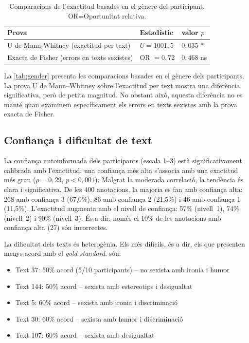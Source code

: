 \iftables
\begin{table}[htbp]
\small
\centering
\begin{tabular}{lll}
\toprule
\textbf{Prova} & \textbf{Estadístic} & \textbf{valor $p$} \\
\midrule
U de Mann-Whitney (exactitud per text) & $U = 1001,5$ & $0,035$ * \\
Exacta de Fisher (errors en texts sexistes) & OR $= 0,72$ & $0,468$ \hphantom{$*$} ns \\
\bottomrule
\end{tabular}
\caption{Comparacions de l'exactitud basades en el gènere del participant. OR=Oportunitat relativa.}
\label{tab:gender}
\end{table}
\fi



La \autoref{tab:gender} presenta les comparacions basades en el gènere dels participants.
La prova U de Mann--Whitney sobre l'exactitud per text mostra una diferència significativa, però de petita magnitud.
No obstant això, aquesta diferència no es manté quan examinem específicament els errors en texts sexistes amb la prova exacta de Fisher.

\subsection{Confiança i dificultat de text}

La confiança autoinformada dels participants (escala 1--3) està significativament calibrada amb l'exactitud: una confiança més alta s'associa amb una exactitud més gran ($\rho = 0,29$, $p < 0,001$).
Malgrat la moderada correlació, la tendència és clara i significativa.
De les 400 anotacions, la majoria es fan amb confiança alta: 268 amb confiança 3 (67,0\%), 86 amb confiança 2 (21,5\%) i 46 amb confiança 1 (11,5\%).
L'exactitud augmenta amb el nivell de confiança: 57\% (nivell~1), 74\% (nivell~2) i 90\% (nivell~3).
És a dir, només el 10\% de les anotacions amb confiança alta (27) són incorrectes.

La dificultat dels texts és heterogènia.
Els més difícils, és a dir, els que presenten menys acord amb el \textit{gold standard}, són:

\begin{itemize}
    \item Text 37: 50\% acord (5/10 participants) -- no sexista amb ironia i humor
    \item Text 144: 50\% acord -- sexista amb estereotips i desigualtat
    \item Text 5: 60\% acord -- sexista amb ironia i discriminació
    \item Text 30: 60\% acord -- sexista amb humor i discriminació
    \item Text 107: 60\% acord -- sexista amb desigualtat
\end{itemize}

